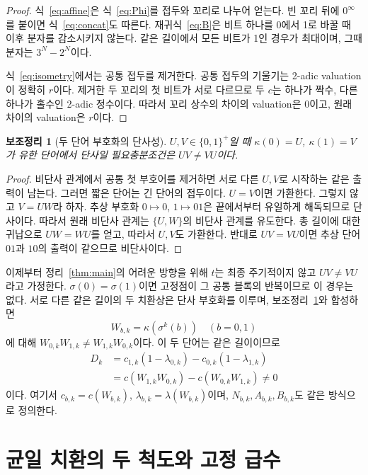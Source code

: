 \documentclass[11pt,a4paper]{article}
\theoremstyle{koreanplain}
\newtheorem{lemma}[theorem]{보조정리}
\begin{document}
\begin{proof}
식~\eqref{eq:affine}은 식~\eqref{eq:Phi}를 접두와 꼬리로 나누어 얻는다. 빈 꼬리 뒤에 $0^\infty$를 붙이면 식~\eqref{eq:concat}도 따른다. 재귀식~\eqref{eq:B}은 비트 하나를 0에서 1로 바꿀 때 이후 분자를 감소시키지 않는다. 같은 길이에서 모든 비트가 1인 경우가 최대이며, 그때 분자는 $3^N-2^N$이다.

식~\eqref{eq:isometry}에서는 공통 접두를 제거한다. 공통 접두의 기울기는 2-adic valuation이 정확히 $r$이다. 제거한 두 꼬리의 첫 비트가 서로 다르므로 두 $c$는 하나가 짝수, 다른 하나가 홀수인 2-adic 정수이다. 따라서 꼬리 상수의 차이의 valuation은 0이고, 원래 차이의 valuation은 $r$이다.
\end{proof}

\begin{lemma}[두 단어 부호화의 단사성]\label{lem:code}
$U,V\in\{0,1\}^{+}$일 때 $\kappa(0)=U$, $\kappa(1)=V$가 유한 단어에서 단사일 필요충분조건은 $UV\ne VU$이다.
\end{lemma}

\begin{proof}
비단사 관계에서 공통 첫 부호어를 제거하면 서로 다른 $U,V$로 시작하는 같은 출력이 남는다. 그러면 짧은 단어는 긴 단어의 접두이다. $U=V$이면 가환한다. 그렇지 않고 $V=UW$라 하자. 추상 부호화 $0\mapsto0$, $1\mapsto01$은 끝에서부터 유일하게 해독되므로 단사이다. 따라서 원래 비단사 관계는 $\{U,W\}$의 비단사 관계를 유도한다. 총 길이에 대한 귀납으로 $UW=WU$를 얻고, 따라서 $U,V$도 가환한다. 반대로 $UV=VU$이면 추상 단어 $01$과 $10$의 출력이 같으므로 비단사이다.
\end{proof}

이제부터 정리~\ref{thm:main}의 어려운 방향을 위해 $t$는 최종 주기적이지 않고 $UV\ne VU$라고 가정한다. $\sigma(0)=\sigma(1)$이면 고정점이 그 공통 블록의 반복이므로 이 경우는 없다. 서로 다른 같은 길이의 두 치환상은 단사 부호화를 이루며, 보조정리~\ref{lem:code}와 합성하면
\[
W_{b,k}=\kappa(\sigma^k(b))\quad(b=0,1)
\]
에 대해 $W_{0,k}W_{1,k}\ne W_{1,k}W_{0,k}$이다. 이 두 단어는 같은 길이이므로
\begin{equation}\label{eq:D}
\begin{split}
D_k&=c_{1,k}(1-\lambda_{0,k})-c_{0,k}(1-\lambda_{1,k})\\
&=c(W_{1,k}W_{0,k})-c(W_{0,k}W_{1,k})\ne0
\end{split}
\end{equation}
이다. 여기서 $c_{b,k}=c(W_{b,k})$, $\lambda_{b,k}=\lambda(W_{b,k})$이며, $N_{b,k},A_{b,k},B_{b,k}$도 같은 방식으로 정의한다.

\section{균일 치환의 두 척도와 고정 급수}
\end{document}
